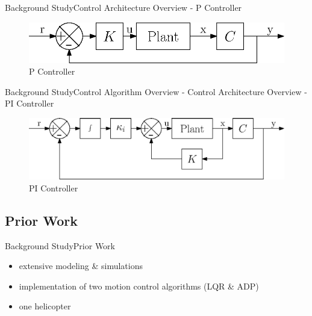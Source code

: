 \documentclass{beamer}
\begin{document}
\begin{frame}{Background Study}{Control Architecture Overview -  P Controller}
\begin{figure}
    \centering
    \includegraphics[width=.8\textwidth,keepaspectratio=true]{figs/ipe/P_Control}
    \caption{P Controller}
    \label{fig:P_Control}
\end{figure}
\end{frame}
\begin{frame}{Background Study}{Control Algorithm Overview - Control Architecture Overview - PI Controller}
\begin{figure}
    \centering
    \includegraphics[width=.8\textwidth,keepaspectratio=true]{figs/ipe/PI_Control}
    \caption{PI Controller}
    \label{fig:PI_Control}
\end{figure}
\end{frame}

\subsection{Prior Work}

\begin{frame}{Background Study}{Prior Work}
  \begin{itemize}
      \item extensive modeling \& simulations
      \item implementation of two motion control algorithms (LQR \& ADP)
      \item one helicopter
  \end{itemize}
\end{frame}


\end{document}
